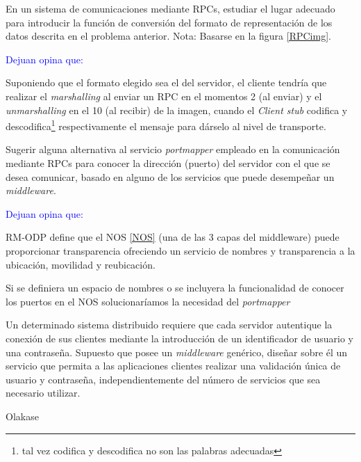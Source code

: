   \begin{problem}[3]
  En un sistema de comunicaciones mediante RPCs, estudiar el lugar adecuado
para introducir la función de conversión del formato de representación de los
datos descrita en el problema anterior. Nota: Basarse en la figura \ref{RPCimg}.
  \solution

\textcolor{blue}{Dejuan opina que:}

Suponiendo que el formato elegido sea el del servidor, el cliente tendría que realizar el \textit{marshalling} al enviar un RPC en el momentos 2 (al enviar) y el \textit{unmarshalling} en el 10 (al recibir) de la imagen, cuando el \textit{Client stub} codifica y descodifica\footnote{tal vez codifica y descodifica no son las palabras adecuadas} respectivamente el mensaje para dárselo al nivel de transporte.

  \end{problem}

  \begin{problem}[4]
  Sugerir alguna alternativa al servicio \textit{portmapper} empleado en la
comunicación mediante RPCs para conocer la dirección (puerto) del servidor
con el que se desea comunicar, basado en alguno de los servicios que puede
desempeñar un \textit{middleware}.
  \solution

\textcolor{blue}{Dejuan opina que:}


RM-ODP define que el NOS \ref{NOS} (una de las 3 capas del middleware) puede proporcionar transparencia ofreciendo un servicio de nombres y transparencia a la ubicación, movilidad y reubicación.

Si se definiera un espacio de nombres o se incluyera la funcionalidad de conocer los puertos en el NOS solucionaríamos la necesidad del \textit{portmapper}

  \end{problem}

  \begin{problem}[5]
  Un determinado sistema distribuido requiere que cada servidor autentique
  la conexión de sus clientes mediante la introducción de un
  identificador de usuario y una contraseña. Supuesto que posee un
  \textit{middleware} genérico, diseñar sobre él un servicio que permita a las
aplicaciones clientes realizar una validación única de usuario y contraseña,
independientemente del número de servicios que sea necesario utilizar.
  \solution

  Olakase

  \end{problem}

